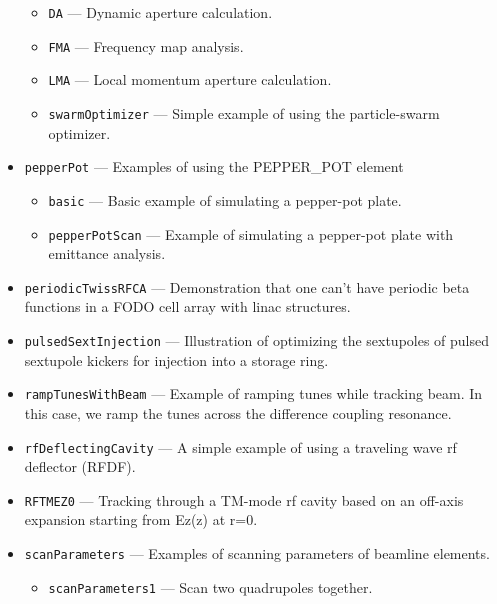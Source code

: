 \begin{itemize}
\begin{itemize}
\item \verb|DA| --- 
 Dynamic aperture calculation. 

\item \verb|FMA| --- 
 Frequency map analysis. 

\item \verb|LMA| --- 
 Local momentum aperture calculation. 

\item \verb|swarmOptimizer| --- 
Simple example of using the particle-swarm optimizer.

\end{itemize}
\item \verb|pepperPot| --- 
Examples of using the PEPPER\_POT element

\begin{itemize}
\item \verb|basic| --- 
 Basic example of simulating a pepper-pot plate. 

\item \verb|pepperPotScan| --- 
 Example of simulating a pepper-pot plate with emittance analysis. 

\end{itemize}
\item \verb|periodicTwissRFCA| --- 
 Demonstration that one can't have periodic beta functions in a FODO cell array with linac structures. 

\item \verb|pulsedSextInjection| --- 
 Illustration of optimizing the sextupoles of pulsed sextupole kickers for injection into a storage ring. 

\item \verb|rampTunesWithBeam| --- 
 Example of ramping tunes while tracking beam. In this case, we ramp the tunes across the difference coupling resonance. 

\item \verb|rfDeflectingCavity| --- 
 A simple example of using a traveling wave rf deflector (RFDF). 

\item \verb|RFTMEZ0| --- 
 Tracking through a TM-mode rf cavity based on an off-axis expansion starting from Ez(z) at r=0. 

\item \verb|scanParameters| --- 
 Examples of scanning parameters of beamline elements. 

\begin{itemize}
\item \verb|scanParameters1| --- 
 Scan two quadrupoles together. 


\end{itemize}
\end{itemize}
